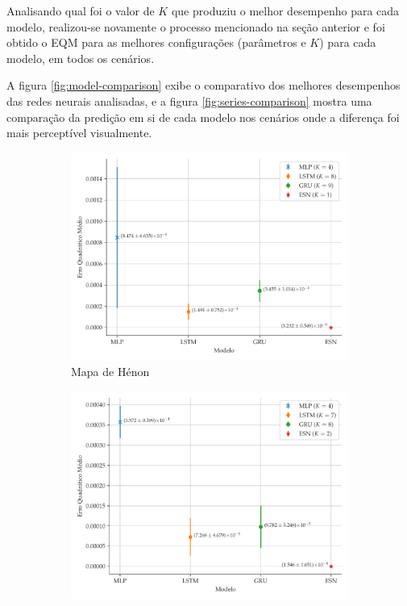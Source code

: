 \documentclass{article}
\begin{document}
Analisando qual foi o valor de $K$ que produziu o melhor desempenho para cada modelo, realizou-se novamente o processo mencionado na seção anterior e foi obtido o EQM para as melhores configurações (parâmetros e $K$) para cada modelo, em todos os cenários. 

A figura \ref{fig:model-comparison} exibe o comparativo dos melhores desempenhos das redes neurais analisadas, e a figura \ref{fig:series-comparison} mostra uma comparação da predição em si de cada modelo nos cenários onde a diferença foi mais perceptível visualmente.
\begin{figure}[!h]
     \begin{subfigure}[t]{0.2\textwidth}
         \includegraphics[scale=0.2]{comparacao-k-henon.pdf}
         \caption{Mapa de Hénon}
     \end{subfigure}
     \centering
     \begin{subfigure}[t]{0.2\textwidth} 
         \includegraphics[scale=0.2]{comparacao-k-logistic.pdf}

\end{subfigure}
\end{figure}
\end{document}
